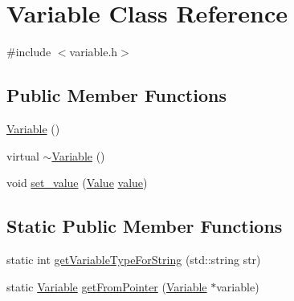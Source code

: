\hypertarget{classVariable}{}\section{Variable Class Reference}
\label{classVariable}


{\ttfamily \#include $<$variable.\+h$>$}

\subsection*{Public Member Functions}
\begin{DoxyCompactItemize}
\item 
\hyperlink{classVariable_a5716c9dcafcc8cf59a6f6b5dac3ec7a2}{Variable} ()
\item 
virtual \hyperlink{classVariable_abeaf0f45e2b8d0b063b567d6491604fd}{$\sim$\+Variable} ()
\item 
void \hyperlink{classVariable_af4e546850a78ab022d111a2d1af5b74d}{set\+\_\+value} (\hyperlink{classValue}{Value} \hyperlink{classVariable_a94151da0f0a411749f84aaf65a9c7045}{value})
\end{DoxyCompactItemize}
\subsection*{Static Public Member Functions}
\begin{DoxyCompactItemize}
\item 
static int \hyperlink{classVariable_aa0be16097cea78860a025aeaac8f6d2e}{get\+Variable\+Type\+For\+String} (std\+::string str)
\item 
static \hyperlink{classVariable}{Variable} \hyperlink{classVariable_a9082f1e84cdaac510ddba4d491d990e0}{get\+From\+Pointer} (\hyperlink{classVariable}{Variable} $\ast$variable)
\end{DoxyCompactItemize}
